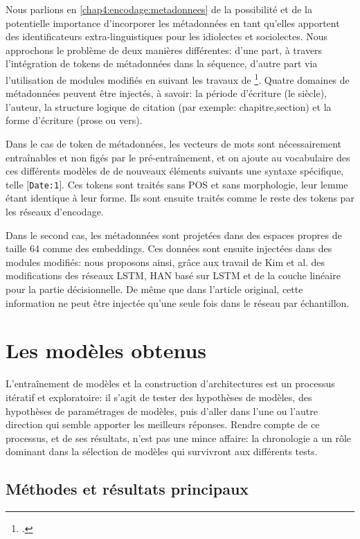 Nous parlions en \ref{chap4:encodage:metadonnees} de la possibilité et de la potentielle importance d'incorporer les métadonnées en tant qu'elles apportent des identificateurs extra-linguistiques pour les idiolectes et sociolectes. Nous approchons le problème de deux manières différentes: d'une part, à travers l'intégration de tokens de métadonnées dans la séquence, d'autre part via l'utilisation de modules modifiés en suivant les travaux de \footcite{kim_categorical_2019}. Quatre domaines de métadonnées peuvent être injectés, à savoir: la période d'écriture (le siècle), l'auteur, la structure logique de citation (par exemple: chapitre,section) et la forme d'écriture (prose ou vers).

Dans le cas de token de métadonnées, les vecteurs de mots sont nécessairement entraînables et non figés par le pré-entraînement, et on ajoute au vocabulaire des ces différents modèles de de nouveaux éléments suivants une syntaxe spécifique, telle \texttt{$[$Date:1$]$}. Ces tokens sont traités sans POS et sans morphologie, leur lemme étant identique à leur forme. Ils sont ensuite traités comme le reste des tokens par les réseaux d'encodage.

Dans le second cas, les métadonnées sont projetées dans des espaces propres de taille 64 comme des embeddings. Ces données sont ensuite injectées dans des modules modifiés: nous proposons ainsi, grâce aux travail de Kim et al. des modifications des réseaux LSTM, HAN basé sur LSTM et de la couche linéaire pour la partie décisionnelle. De même que dans l'article original, cette information ne peut être injectée qu'une seule fois dans le réseau par échantillon.

\section{Les modèles obtenus}

L'entraînement de modèles et la construction d'architectures est un processus itératif et exploratoire: il s'agit de tester des hypothèses de modèles, des hypothèses de paramétrages de modèles, puis d'aller dans l'une ou l'autre direction qui semble apporter les meilleurs réponses. Rendre compte de ce processus, et de ses résultats, n'est pas une mince affaire: la chronologie a un rôle dominant dans la sélection de modèles qui survivront aux différents tests.

\subsection{Méthodes et résultats principaux}

